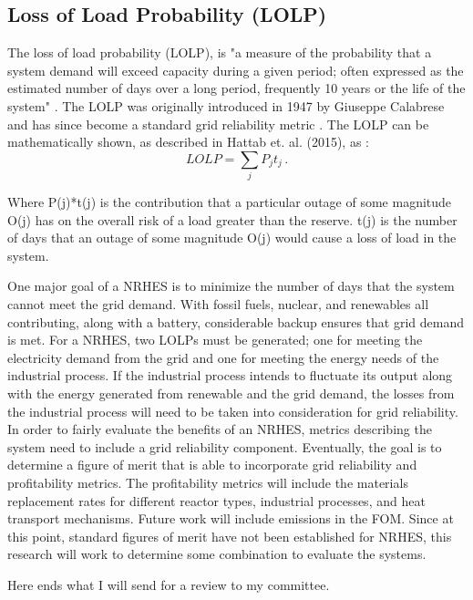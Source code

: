 \documentclass[12pt]{UIdahoMastersThesis}
\begin{document}
\subsection{Loss of Load Probability (LOLP)}
The loss of load probability (LOLP), is "a measure of the probability that a system demand will exceed capacity during a given period; often expressed as the estimated number of days over a long period, frequently 10 years or the life of the system" \cite{Electromn}. The LOLP was originally introduced in 1947 by Giuseppe Calabrese and has since become a standard grid reliability metric \cite{calabrese1947generating}. The LOLP can be mathematically shown, as described in Hattab et. al. (2015), as \cite{Hattab2015}:
\begin{equation*}
LOLP =\sum_{j} P_jt_j\,.
\end{equation*}
 
Where P(j)*t(j) is the contribution that a particular outage of some magnitude O(j) has on the overall risk of a load greater than the reserve. t(j) is the number of days that an outage of some magnitude O(j) would cause a loss of load in the system\cite{Hattab2015}.
 
One major goal of a NRHES is to minimize the number of days that the system cannot meet the grid demand.  With fossil fuels, nuclear, and renewables all contributing, along with a battery, considerable backup ensures that grid demand is met. For a NRHES, two LOLPs must be generated; one for meeting the electricity demand from the grid and one for meeting the energy needs of the industrial process.  If the industrial process intends to fluctuate its output along with the energy generated from renewable and the grid demand, the losses from the industrial process will need to be taken into consideration for grid reliability. In order to fairly evaluate the benefits of an NRHES, metrics describing the system need to include a grid reliability component. 
Eventually, the goal is to determine a figure of merit that is able to incorporate grid reliability and profitability metrics.  The profitability metrics will include the materials replacement rates for different reactor types, industrial processes, and heat transport mechanisms. Future work will include emissions in the FOM. Since at this point, standard figures of merit have not been established for NRHES, this research will work to determine some combination to evaluate the systems.


Here ends what I will send for a review to my committee.
\end{document}
